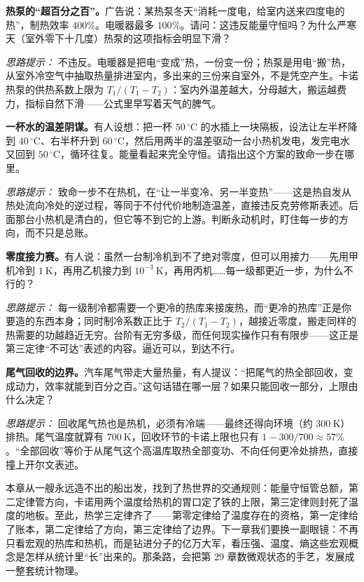 \begin{puzzles}
\item \textbf{热泵的“超百分之百”。}广告说：某热泵冬天“消耗一度电，给室内送来四度电的热”，制热效率 \(400\%\)。电暖器最多 \(100\%\)。请问：这违反能量守恒吗？为什么严寒天（室外零下十几度）热泵的这项指标会明显下滑？

  \textit{思路提示：} 不违反。电暖器是把电“变成”热，一份变一份；热泵是用电“搬”热，从室外冷空气中抽取热量排进室内，多出来的三份来自室外，不是凭空产生。卡诺热泵的供热系数上限为 \(T_1/(T_1-T_2)\)：室内外温差越大，分母越大，搬运越费力，指标自然下滑——公式里早写着天气的脾气。

\item \textbf{一杯水的温差阴谋。}有人设想：把一杯 \(50\,^\circ\mathrm{C}\) 的水插上一块隔板，设法让左半杯降到 \(40\,^\circ\mathrm{C}\)、右半杯升到 \(60\,^\circ\mathrm{C}\)，然后用两半的温差驱动一台小热机发电，发完电水又回到 \(50\,^\circ\mathrm{C}\)，循环往复。能量看起来完全守恒。请指出这个方案的致命一步在哪里。

  \textit{思路提示：} 致命一步不在热机，在“让一半变冷、另一半变热”——这是热自发从热处流向冷处的逆过程，等同于不付代价地制造温差，直接违反克劳修斯表述。后面那台小热机是清白的，但它等不到它的上游。判断永动机时，盯住每一步的方向，而不只是总账。

\item \textbf{零度接力赛。}有人说：虽然一台制冷机到不了绝对零度，但可以用接力——先用甲机冷到 \(1\ \mathrm{K}\)，再用乙机接力到 \(10^{-3}\ \mathrm{K}\)，再用丙机……每一级都更近一步，为什么不行的？

  \textit{思路提示：} 每一级制冷都需要一个更冷的热库来接废热，而“更冷的热库”正是你要造的东西本身；同时制冷系数正比于 \(T_2/(T_1-T_2)\)，越接近零度，搬走同样的热需要的功越趋近无穷。台阶有无穷多级，而任何现实操作只有有限步——这正是第三定律“不可达”表述的内容。逼近可以，到达不行。

\item \textbf{尾气回收的边界。}汽车尾气带走大量热量，有人提议：“把尾气的热全部回收，变成动力，效率就能到百分之百。”这句话错在哪一层？如果只能回收一部分，上限由什么决定？

  \textit{思路提示：} 回收尾气热也是热机，必须有冷端——最终还得向环境（约 \(300\ \mathrm{K}\)）排热。尾气温度就算有 \(700\ \mathrm{K}\)，回收环节的卡诺上限也只有 \(1-300/700\approx 57\%\)。“全部回收”等价于从尾气这个高温库取热全部变功、不向任何更冷处排热，直接撞上开尔文表述。
\end{puzzles}

本章从一艘永远造不出的船出发，找到了热世界的交通规则：能量守恒管总额，第二定律管方向，卡诺用两个温度给热机的胃口定了铁的上限，第三定律则封死了温度的地板。至此，热学三定律齐了——第零定律给了温度存在的资格，第一定律给了账本，第二定律给了方向，第三定律给了边界。下一章我们要换一副眼镜：不再只看宏观的热库和热机，而是钻进分子的亿万大军，看压强、温度、熵这些宏观概念是怎样从统计里“长”出来的。那条路，会把第 29 章数微观状态的手艺，发展成一整套统计物理。
